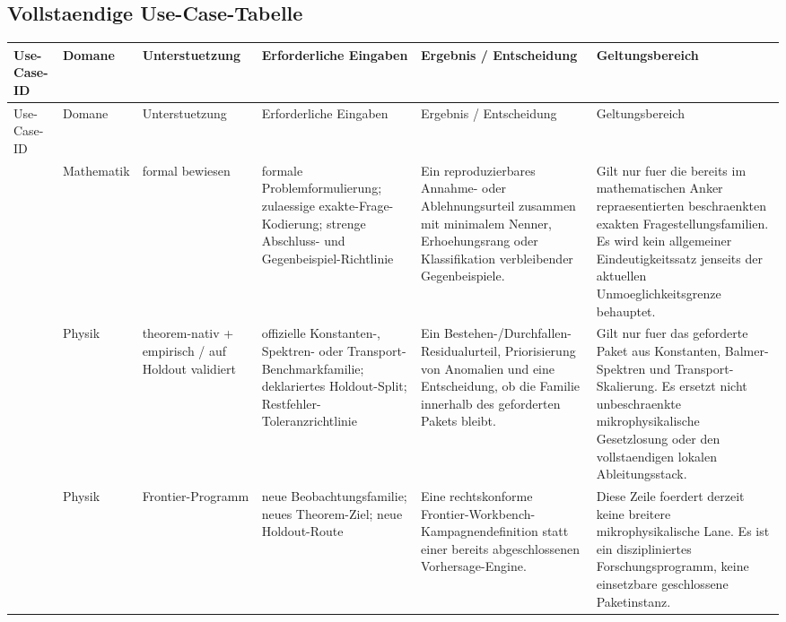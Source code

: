 
\begingroup
\scriptsize
\setlength{\tabcolsep}{2pt}

\subsection{Vollstaendige Use-Case-Tabelle}
\begin{longtable}{@{}L{0.13\textwidth}L{0.14\textwidth}L{0.12\textwidth}L{0.18\textwidth}L{0.17\textwidth}L{0.20\textwidth}@{}}
\toprule
Use-Case-ID & Domane & Unterstuetzung & Erforderliche Eingaben & Ergebnis / Entscheidung & Geltungsbereich \\
\midrule
\endfirsthead
\toprule
Use-Case-ID & Domane & Unterstuetzung & Erforderliche Eingaben & Ergebnis / Entscheidung & Geltungsbereich \\
\midrule
\endhead
{} & Mathematik & formal bewiesen & formale Problemformulierung; \allowbreak zulaessige exakte-Frage-Kodierung; \allowbreak strenge Abschluss- und Gegenbeispiel-Richtlinie & Ein reproduzierbares Annahme- oder Ablehnungsurteil zusammen mit minimalem Nenner, Erhoehungsrang oder Klassifikation verbleibender Gegenbeispiele. & Gilt nur fuer die bereits im mathematischen Anker repraesentierten beschraenkten exakten Fragestellungsfamilien. Es wird kein allgemeiner Eindeutigkeitssatz jenseits der aktuellen Unmoeglichkeitsgrenze behauptet. \\
 & Physik & theorem-nativ + empirisch / auf Holdout validiert & offizielle Konstanten-, Spektren- oder Transport-Benchmarkfamilie; \allowbreak deklariertes Holdout-Split; \allowbreak Restfehler-Toleranzrichtlinie & Ein Bestehen-/Durchfallen-Residualurteil, Priorisierung von Anomalien und eine Entscheidung, ob die Familie innerhalb des geforderten Pakets bleibt. & Gilt nur fuer das geforderte Paket aus Konstanten, Balmer-Spektren und Transport-Skalierung. Es ersetzt nicht unbeschraenkte mikrophysikalische Gesetzlosung oder den vollstaendigen lokalen Ableitungsstack. \\
 & Physik & Frontier-Programm & neue Beobachtungsfamilie; \allowbreak neues Theorem-Ziel; \allowbreak neue Holdout-Route & Eine rechtskonforme Frontier-Workbench-Kampagnendefinition statt einer bereits abgeschlossenen Vorhersage-Engine. & Diese Zeile foerdert derzeit keine breitere mikrophysikalische Lane. Es ist ein diszipliniertes Forschungsprogramm, keine einsetzbare geschlossene Paketinstanz. \\

\end{longtable}
